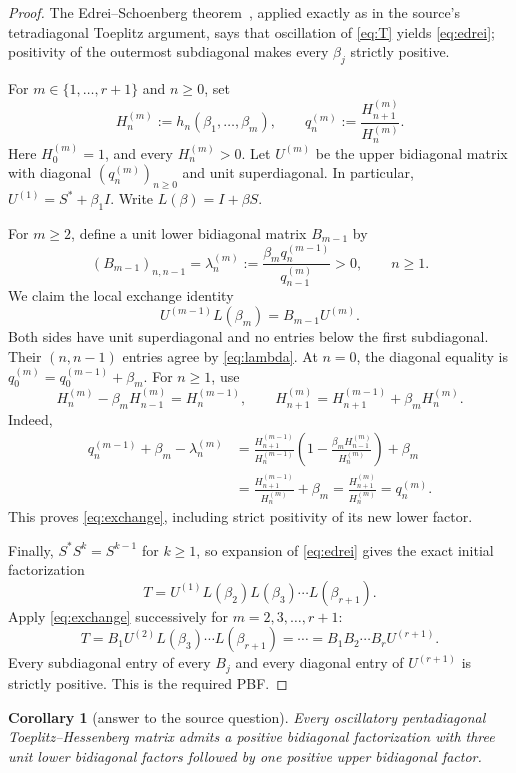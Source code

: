 \documentclass[11pt]{article}
\newtheorem{corollary}{Corollary}
\begin{document}
\begin{proof}
The Edrei--Schoenberg theorem~\cite{edrei,schoenberg}, applied exactly as in
the source's tetradiagonal Toeplitz argument, says that oscillation of
\eqref{eq:T} yields \eqref{eq:edrei}; positivity of the outermost
subdiagonal makes every $\beta_j$ strictly positive.

For $m\in\{1,\ldots,r+1\}$ and $n\ge0$, set
\[
 H_n^{(m)}:=h_n(\beta_1,\ldots,\beta_m),
 \qquad q_n^{(m)}:=\frac{H_{n+1}^{(m)}}{H_n^{(m)}}.
\]
Here $H_0^{(m)}=1$, and every $H_n^{(m)}>0$.  Let $U^{(m)}$ be the upper
bidiagonal matrix with diagonal $(q_n^{(m)})_{n\ge0}$ and unit
superdiagonal.  In particular,
$U^{(1)}=S^*+\beta_1I$.  Write $L(\beta)=I+\beta S$.

For $m\ge2$, define a unit lower bidiagonal matrix $B_{m-1}$ by
\[
 (B_{m-1})_{n,n-1}=\lambda_n^{(m)}
 :=\frac{\beta_m q_n^{(m-1)}}{q_{n-1}^{(m)}}>0,
 \qquad n\ge1.                                      \tag{4}\label{eq:lambda}
\]
We claim the local exchange identity
\[
                 U^{(m-1)}L(\beta_m)=B_{m-1}U^{(m)}. \tag{5}\label{eq:exchange}
\]
Both sides have unit superdiagonal and no entries below the first
subdiagonal.  Their $(n,n-1)$ entries agree by \eqref{eq:lambda}.  At $n=0$,
the diagonal equality is
$q_0^{(m)}=q_0^{(m-1)}+\beta_m$.  For $n\ge1$, use
\[
 H_n^{(m)}-\beta_mH_{n-1}^{(m)}=H_n^{(m-1)},
 \qquad
 H_{n+1}^{(m)}=H_{n+1}^{(m-1)}+\beta_mH_n^{(m)}.    \tag{6}\label{eq:hrec}
\]
Indeed,
\begin{align*}
 q_n^{(m-1)}+\beta_m-\lambda_n^{(m)}
 &=\frac{H_{n+1}^{(m-1)}}{H_n^{(m-1)}}
   \left(1-\frac{\beta_mH_{n-1}^{(m)}}{H_n^{(m)}}\right)+\beta_m\\
 &=\frac{H_{n+1}^{(m-1)}}{H_n^{(m)}}+\beta_m
  =\frac{H_{n+1}^{(m)}}{H_n^{(m)}}=q_n^{(m)}.
\end{align*}
This proves \eqref{eq:exchange}, including strict positivity of its new
lower factor.

Finally, $S^*S^k=S^{k-1}$ for $k\ge1$, so expansion of \eqref{eq:edrei}
gives the exact initial factorization
\[
 T=U^{(1)}L(\beta_2)L(\beta_3)\cdots L(\beta_{r+1}). \tag{7}\label{eq:wrong}
\]
Apply \eqref{eq:exchange} successively for $m=2,3,\ldots,r+1$:
\[
 T=B_1U^{(2)}L(\beta_3)\cdots L(\beta_{r+1})
   =\cdots=B_1B_2\cdots B_rU^{(r+1)}.
\]
Every subdiagonal entry of every $B_j$ and every diagonal entry of
$U^{(r+1)}$ is strictly positive.  This is the required PBF.
\end{proof}

\begin{corollary}[answer to the source question]
Every oscillatory pentadiagonal Toeplitz--Hessenberg matrix admits a positive
bidiagonal factorization with three unit lower bidiagonal factors followed by
one positive upper bidiagonal factor.
\end{corollary}
\end{document}
